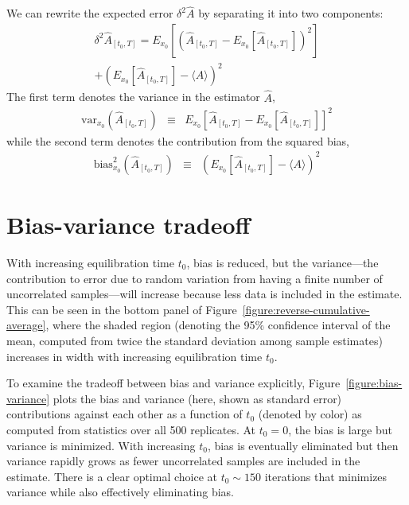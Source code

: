\documentclass[aps,pre,twocolumn,nofootinbib,superscriptaddress,linenumbers,11point]{revtex4-1}
\newcommand{\expect}[1]{\langle #1 \rangle}                %
\begin{document}
We can rewrite the expected error $\delta^2 \hat{A}$ by separating it into two components:
\begin{eqnarray}
\delta^2 \hat{A}_{[t_0,T]} = E_{x_0}\left[ \left( \hat{A}_{[t_0,T]} - E_{x_0}[\hat{A}_{[t_0,T]}] \right)^2 \right] \nonumber \\
+ \left( E_{x_0}[\hat{A}_{[t_0,T]}] - \expect{A} \right)^2  \label{equation:bias-variance}  
\end{eqnarray}
The first term denotes the variance in the estimator $\hat{A}$,
\begin{eqnarray}
\mathrm{var}_{x_0} (\hat{A}_{[t_0,T]}) &\equiv& E_{x_0} \left[ \hat{A}_{[t_0,T]} - E_{x_0}[\hat{A}_{[t_0,T]}] \right]^2 \label{equation:variance}
\end{eqnarray}
while the second term denotes the contribution from the squared bias,
\begin{eqnarray}
\mathrm{bias}^2_{x_0} (\hat{A}_{[t_0,T]}) &\equiv& \left( E_{x_0}[\hat{A}_{[t_0,T]}] - \expect{A} \right)^2 \label{equation:variance}
\end{eqnarray}


\section*{Bias-variance tradeoff}

With increasing equilibration time $t_0$, bias is reduced, but the variance---the contribution to error due to random variation from having a finite number of uncorrelated samples---will increase because less data is included in the estimate.
This can be seen in the bottom panel of Figure~\ref{figure:reverse-cumulative-average}, where the shaded region (denoting the 95\% confidence interval of the mean, computed from twice the standard deviation among sample estimates) increases in width with increasing equilibration time $t_0$.

To examine the tradeoff between bias and variance explicitly, Figure~\ref{figure:bias-variance} plots the bias and variance (here, shown as standard error) contributions against each other as a function of $t_0$ (denoted by color) as computed from statistics over all 500 replicates.
At $t_0 = 0$, the bias is large but variance is minimized.
With increasing $t_0$, bias is eventually eliminated but then variance rapidly grows as fewer uncorrelated samples are included in the estimate.
There is a clear optimal choice at $t_0 \sim 150$ iterations that minimizes variance while also effectively eliminating bias.
\end{document}
